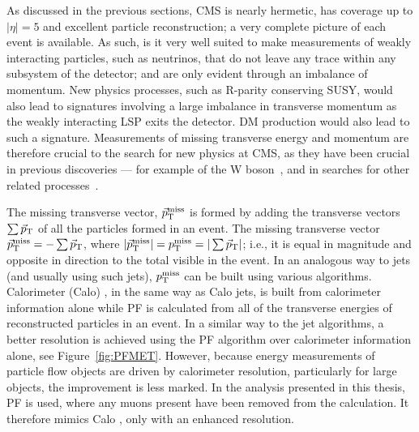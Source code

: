 As discussed in the previous sections, \ac{CMS} is nearly hermetic, has coverage up to $|\eta| = 5$ and excellent particle reconstruction; a very complete picture of each event is available. 
As such, is it very well suited to make measurements of weakly interacting particles, such as neutrinos, that do not leave any trace within any subsystem of the detector; and are only evident through an imbalance of  momentum.
New physics processes, such as R-parity conserving \ac{SUSY}, would also lead to signatures involving a large imbalance in transverse momentum as the weakly interacting \ac{LSP} exits the detector. \ac{DM} production would also lead to such a signature.
Measurements of missing transverse energy and momentum are therefore crucial to the search for new physics at \ac{CMS}, as they have been crucial in previous discoveries --- for example of the W boson~\cite{bib:Wdiscovery}, and in searches for other related processes~\cite{Albajar:173124,Albajar:173125}. 

The missing transverse  vector, $\vec{p}_{\text{T}}^{\text{miss}}$ is formed by adding the transverse  vectors $\sum \vec{p}_{\text{T}}$ of all the particles formed in an event. The missing transverse  vector $\vec{p}_{\text{T}}^{\text{miss}} = - \sum \vec{p}_{\text{T}}$, where $|\vec{p}_{\text{T}}^{\text{miss}}| = p_{\text{T}}^{\text{miss}} = |\sum \vec{p}_{\text{T}}|$; i.e., it is equal in magnitude and opposite in direction to the total visible  in the event. 
In an analogous way to jets (and usually using such jets), $p_{\text{T}}^{\text{miss}}$ can be built using various algorithms. 
Calorimeter (Calo) \MET, in the same way as Calo jets, is built from calorimeter information alone while
\ac{PF} \MET is calculated from all of the transverse energies of reconstructed particles in an event. 
In a similar way to the jet algorithms, a better resolution is achieved using the \ac{PF} algorithm over calorimeter information alone, see Figure~\ref{fig:PFMET}. 
However, because energy measurements of particle flow objects are driven by calorimeter resolution, particularly for large \ET objects, the improvement is less marked.
In the analysis presented in this thesis, \ac{PF} \MET is used, where any muons present have been removed from the  calculation. It therefore mimics Calo \MET, only with an enhanced resolution. 

